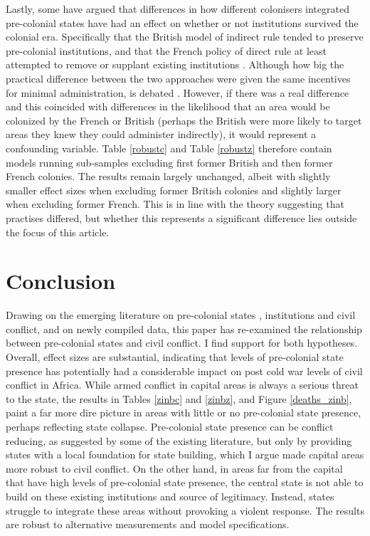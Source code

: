 \documentclass[12pt]{article}
\begin{document}
Lastly, some have argued that differences in how different colonisers integrated
pre-colonial states have had an effect on whether or not institutions survived
the colonial era. Specifically that the British model of indirect rule tended to
preserve pre-colonial institutions, and that the French policy of direct rule at
least attempted to remove or supplant existing institutions \citep{Paine2019}.
Although how big the practical difference between the two approaches were given
the same incentives for minimal administration, is debated
\citep{boone2014property, englebert2013inside}. However, if there was a real
difference and this coincided with differences in the likelihood that an area
would be colonized by the French or British (perhaps the British were more
likely to target areas they knew they could administer indirectly), it would
represent a confounding variable. Table \ref{robustc} and Table \ref{robustz}
therefore contain models running sub-samples excluding first former British and
then former French colonies. The results remain largely unchanged, albeit with
slightly smaller effect sizes when excluding former British colonies and
slightly larger when excluding former French. This is in line with the theory
suggesting that practises differed, but whether this represents a significant
difference lies outside the focus of this article.

\section{Conclusion} \label{Conclusion}

Drawing on the emerging literature on pre-colonial states \citep{Paine2019,
Depetris-Chauvin2016}, institutions \citep{Wig2016, Englebert2002,
Michalopoulos2018} and civil conflict, and on newly compiled data, this paper
has re-examined the relationship between pre-colonial states and civil conflict.
I find support for both hypotheses. Overall, effect sizes are substantial,
indicating that levels of pre-colonial state presence has potentially had a
considerable impact on post cold war levels of civil conflict in Africa. While
armed conflict in capital areas is always a serious threat to the state, the
results in Tables \ref{zinbc} and \ref{zinbz}, and Figure \ref{deaths_zinb},
paint a far more dire picture in areas with little or no pre-colonial state
presence, perhaps reflecting state collapse. Pre-colonial state presence can be
conflict reducing, as suggested by some of the existing literature, but only by
providing states with a local foundation for state building, which I argue made
capital areas more robust to civil conflict. On the other hand, in areas far
from the capital that have high levels of pre-colonial state presence, the
central state is not able to build on these existing institutions and source of
legitimacy. Instead, states struggle to integrate these areas without provoking
a violent response. The results are robust to alternative measurements and model
specifications.
\end{document}
